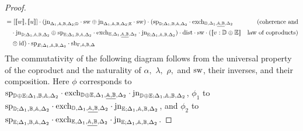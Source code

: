 \documentclass[10pt,a4paper]{amsart}
\theoremstyle{definition}
\theoremstyle{definition}
\theoremstyle{definition}
\theoremstyle{definition}
\theoremstyle{definition}
\theoremstyle{definition}
\begin{document}
\begin{proof}
\begin{align*}
  & = [[\![ w ]\!] ,  [\![u ]\!]] \cdot  (\text{jn}_{\Delta_{1},\mathbb{A},\mathbb{B},  \Delta_{2};\mathbb{D}} \cdot \mathrm{sw} \oplus \text{jn}_{\Delta_{1},\mathbb{A},\mathbb{B},  \Delta_{2};\mathbb{E}} \cdot \mathrm{sw} ) \cdot (\text{sp}_{\mathbb{D};\Delta_{1}, \mathbb{B}, \mathbb{A}, \Delta_{2}} \cdot  \text{exch}_{\mathbb{D}, \Delta_{1},\underline{\mathbb{A},\mathbb{B}},  \Delta_{2}}   & {\text{(coherence and}} \\
  & \hspace{10pt} \cdot \text{jn}_{\mathbb{D};\Delta_{1},\mathbb{A},\mathbb{B},  \Delta_{2}} \oplus \text{sp}_{\mathbb{E};\Delta_{1}, \mathbb{B}, \mathbb{A}, \Delta_{2}} \cdot  \text{exch}_{\mathbb{E}, \Delta_{1},\underline{\mathbb{A},\mathbb{B}},  \Delta_{2}} \cdot \text{jn}_{\mathbb{E};\Delta_{1},\mathbb{A},\mathbb{B},  \Delta_{2}} )   \cdot \mathrm{dist} \cdot \mathrm{sw} \cdot ([\![  v : \mathbb{D} \oplus \mathbb{E}  ]\!] & {\text{law of coproducts)}}  \\
  & \hspace{10pt} \otimes \text{id})  \cdot\text{sp}_{E; \Delta_{1},\mathbb{A},\mathbb{B},  \Delta_{2}} \cdot \text{sh}_{\Gamma,\mathbb{A}, \mathbb{B},\Delta} \\ 
\end{align*}
The commutativity of the following diagram follows from the universal property of the coproduct and the naturality of $\alpha,$ $\lambda,$ $\rho,$ and $\mathrm{sw}$, their inverses, and their composition. Here $\phi$ corresponds to $\text{sp}_{\mathbb{D} \oplus \mathbb{E};\Delta_{1}, \mathbb{B}, \mathbb{A}, \Delta_{2}} \cdot  \text{exch}_{\mathbb{D} \oplus \mathbb{E}, \Delta_{1},\underline{\mathbb{A},\mathbb{B}},  \Delta_{2}} \cdot \text{jn}_{\mathbb{D} \oplus \mathbb{E};\Delta_{1},\mathbb{A},\mathbb{B},  \Delta_{2}}$, $\phi_1$ to $\text{sp}_{\mathbb{D};\Delta_{1}, \mathbb{B}, \mathbb{A}, \Delta_{2}} \cdot  \text{exch}_{\mathbb{D}, \Delta_{1},\underline{\mathbb{A},\mathbb{B}},  \Delta_{2}} \cdot \text{jn}_{\mathbb{E};\Delta_{1},\mathbb{A},\mathbb{B},  \Delta_{2}}$, and $\phi_2$ to $\text{sp}_{\mathbb{E};\Delta_{1}, \mathbb{B}, \mathbb{A}, \Delta_{2}} \cdot  \text{exch}_{\mathbb{E}, \Delta_{1},\underline{\mathbb{A},\mathbb{B}},  \Delta_{2}} \cdot \text{jn}_{\mathbb{E};\Delta_{1},\mathbb{A},\mathbb{B},  \Delta_{2}}$.


\end{proof}
\end{document}
